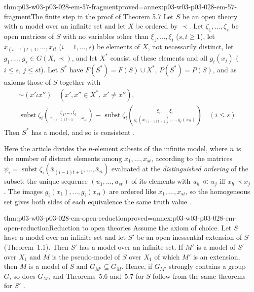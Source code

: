 \begin{hblemma}{thm:p03-w03-p03-028-em-57-fragment}{proved=annex:p03-w03-p03-028-em-57-fragment}{The finite step in the proof of Theorem 5.7}
Let \(S\) be an open theory with a model over an infinite set and let \(X\)
be ordered by \(\prec\).  Let \(\zeta_1,\ldots,\zeta_s\) be open matrices of
\(S\) with no variables other than \(\xi_1,\ldots,\xi_t\) (\(s,t\geq1\)), let
\(x_{(i-1)t+1},\ldots,x_{it}\) (\(i=1,\ldots,s\)) be elements of \(X\), not
necessarily distinct, let \(g_1,\ldots,g_s\in G(X,\prec)\), and let \(X^*\)
consist of these elements and all \(g_i(x_j)\) (\(i\leq s\), \(j\leq st\)).
Let \(S^*\) have \(F(S^*)=F(S)\cup X^*\), \(P(S^*)=P(S)\), and as axioms those
of \(S\) together with
\cite[(5.7.2)--(5.7.3), p.~63]{EhrenfeuchtMostowski1956}
\begin{gather*}
  \mathord\sim(x'\iota x'')\quad(x',x''\in X^*,\ x'\neq x''),\\
  \operatorname{subst}\zeta_i\binom{\xi_1,\ldots,\xi_t}{x_{(i-1)t+1},\ldots,x_{it}}
  \equiv
  \operatorname{subst}\zeta_i\binom{\xi_1,\ldots,\xi_t}{g_i(x_{(i-1)t+1}),\ldots,g_i(x_{it})}
  \quad(i\leq s).
\end{gather*}
Then \(S^*\) has a model, and so is consistent
\cite[pp.~63--66]{EhrenfeuchtMostowski1956}.
\end{hblemma}

Here the article divides the \(n\)-element subsets of the infinite model,
where \(n\) is the number of distinct elements among
\(x_1,\ldots,x_{st}\), according to the matrices
\(\psi_i=\operatorname{subst}\zeta_i(\bar x_{(i-1)t+1},\ldots,\bar x_{it})\)
evaluated at the \emph{distinguished ordering} of the subset: the unique
sequence \((u_1,\ldots,u_{st})\) of its elements with \(u_h\ll u_j\) iff
\(x_h\prec x_j\) \cite[pp.~64--65]{EhrenfeuchtMostowski1956}.  The images
\(g_i(x_1),\ldots,g_i(x_{st})\) are ordered like \(x_1,\ldots,x_{st}\), so the
homogeneous set gives both sides of each equivalence the same truth value
\cite[(5.7.8)--(5.7.10), pp.~65--66]{EhrenfeuchtMostowski1956}.

\begin{hblemma}{thm:p03-w03-p03-028-em-open-reduction}{proved=annex:p03-w03-p03-028-em-open-reduction}{Reduction to open theories}
Assume the axiom of choice.  Let \(S\) have a model over an infinite set and
let \(S'\) be an open inessential extension of \(S\) (Theorem~1.1).  Then
\(S'\) has a model over an infinite set.  If \(M'\) is a model of \(S'\) over
\(X_1\) and \(M\) is the pseudo-model of \(S\) over \(X_1\) of which \(M'\) is
an extension, then \(M\) is a model of \(S\) and \(G_{M'}\subseteq G_M\).
Hence, if \(G_{M'}\) strongly contains a group \(G\), so does \(G_M\), and
Theorems~5.6 and~5.7 for \(S\) follow from the same theorems for \(S'\)
\cite[pp.~62--63]{EhrenfeuchtMostowski1956}.
\end{hblemma}


